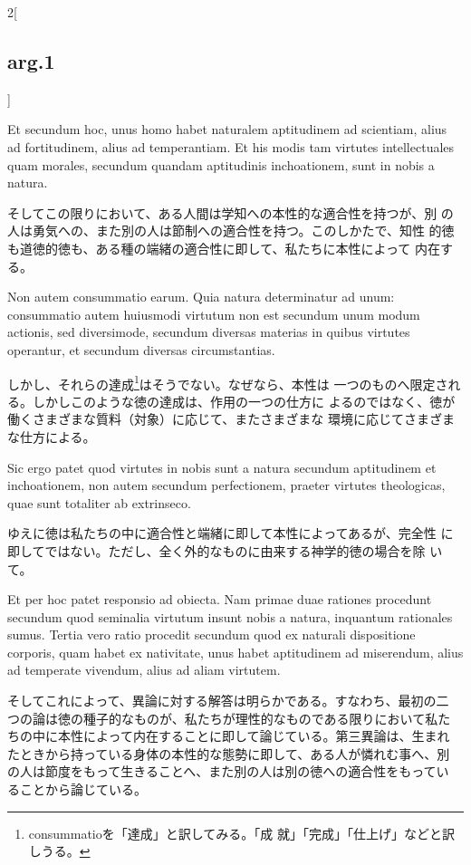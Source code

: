\documentclass[paper=a4paper,fontsize=10pt,jafontsize=9pt,titlepage]{jlreq}
\begin{document}
\begin{paracol}{2}[\subsection{arg.1}]
\switchcolumn*

Et secundum hoc, unus homo habet naturalem aptitudinem ad scientiam,
 alius ad fortitudinem, alius ad temperantiam. Et his modis tam
 virtutes intellectuales quam morales, secundum quandam aptitudinis
 inchoationem, sunt in nobis a natura.

\switchcolumn

そしてこの限りにおいて、ある人間は学知への本性的な適合性を持つが、別
 の人は勇気への、また別の人は節制への適合性を持つ。このしかたで、知性
 的徳も道徳的徳も、ある種の端緒の適合性に即して、私たちに本性によって
 内在する。

\switchcolumn*

Non autem consummatio earum. Quia natura determinatur ad unum:
 consummatio autem huiusmodi virtutum non est secundum unum modum
 actionis, sed diversimode, secundum diversas materias in quibus
 virtutes operantur, et secundum diversas circumstantias.

\switchcolumn

しかし、それらの達成\footnote{consummatioを「達成」と訳してみる。「成
就」「完成」「仕上げ」などと訳しうる。}はそうでない。なぜなら、本性は
一つのものへ限定される。しかしこのような徳の達成は、作用の一つの仕方に
よるのではなく、徳が働くさまざまな質料（対象）に応じて、またさまざまな
環境に応じてさまざまな仕方による。

\switchcolumn*

Sic ergo patet quod virtutes in nobis sunt a natura secundum
 aptitudinem et inchoationem, non autem secundum perfectionem, praeter
 virtutes theologicas, quae sunt totaliter ab extrinseco.

\switchcolumn

ゆえに徳は私たちの中に適合性と端緒に即して本性によってあるが、完全性
 に即してではない。ただし、全く外的なものに由来する神学的徳の場合を除
 いて。

\switchcolumn*

Et per hoc patet responsio ad obiecta. Nam primae duae rationes
procedunt secundum quod seminalia virtutum insunt nobis a natura,
inquantum rationales sumus. Tertia vero ratio procedit secundum quod
ex naturali dispositione corporis, quam habet ex nativitate, unus
habet aptitudinem ad miserendum, alius ad temperate vivendum, alius ad
aliam virtutem.

\switchcolumn

そしてこれによって、異論に対する解答は明らかである。すなわち、最初の二
つの論は徳の種子的なものが、私たちが理性的なものである限りにおいて私た
ちの中に本性によって内在することに即して論じている。第三異論は、生まれ
たときから持っている身体の本性的な態勢に即して、ある人が憐れむ事へ、別
の人は節度をもって生きることへ、また別の人は別の徳への適合性をもってい
ることから論じている。

\end{paracol}
\newpage
{}
{}
\setcounter{section}{2}
\setcounter{subsection}{0}
\end{document}
